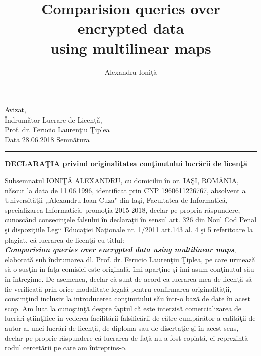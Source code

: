\documentclass[a4paper, 12pt, oneside]{article}
\begin{document}
\title{Comparision queries over encrypted data \\using multilinear maps}

\bigskip
\author{Alexandru Ioni\c t\u a}

\maketitle

\pagebreak



\begin{flushright}
Avizat,\\
\^Indrum\u ator Lucrare de Licen\c t\u a,\\
Prof. dr. Ferucio Lauren\c tiu \c Tiplea\\
Data 28.06.2018 \hspace{0.4cm} Semn\u atura \rule{3.5cm}{0.4pt}
\end{flushright}

\begin{center}
\textbf{DECLARA\c TIA privind originalitatea con\c tinutului lucr\u arii de licen\c t\u a}
\end{center}


Subsemnatul IONI\c T\u A ALEXANDRU, cu domiciliu \^in or. IA\c SI, ROM\^ ANIA, n\u ascut la data de 11.06.1996, identificat prin CNP 1960611226767, absolvent a Universit\u a\c tii ,,Alexandru Ioan Cuza" din Ia\c si, Facultatea de Informatic\u a, specializarea Informatic\u a, promo\c tia 2015-2018, declar pe propria r\u aspundere, cunosc\^and consecin\c tele falsului \^in declara\c tii \^in sensul art. 326 din Noul Cod Penal \c si dispozi\c tiile Legii Educa\c tiei Na\c tionale nr. 1/2011 art.143 al. 4 \c si 5 referitoare la plagiat, c\u a lucrarea de licen\c t\u a cu titlul:\\ \textbf{\textit{Comparision queries over encrypted data using multilinear maps}}, elaborat\u a sub \^indrumarea dl. Prof. dr. Ferucio Lauren\c tiu \c Tiplea, pe care urmeaz\u a s\u a o sus\c tin \^in fa\c ta comisiei este original\u a, \^imi apar\c tine \c si \^imi asum con\c tinutul s\u au \^in \^intregime. De asemenea, declar c\u a sunt de acord ca lucrarea mea de licen\c t\u a s\u a fie verificat\u a prin orice modalitate legal\u a pentru confirmarea originalit\u a\c tii, consim\c tind inclusiv la introducerea con\c tinutului s\u au \^intr-o baz\u a de date \^in acest scop. Am luat la cuno\c stin\c t\u a despre faptul c\u a este interzis\u a comercializarea de lucr\u ari \c stiin\c tifice \^in vederea facilit\u arii falsific\u arii de c\u atre cump\u ar\u ator a calit\u a\c tii de autor al unei lucr\u ari de licen\c t\u a, de diploma sau de diserta\c tie \c si \^in acest sens, declar pe proprie r\u aspundere c\u a lucrarea de fa\c t\u a nu a fost copiat\u a, ci reprezint\u a rodul cercet\u arii pe care am \^intreprins-o.
\end{document}
